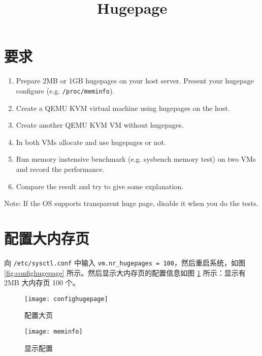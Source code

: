 

    \title{Hugepage}
    \maketitle
    \tableofcontents
    \section{要求}
    \begin{enumerate}[(1)]
        \item Prepare 2MB or 1GB hugepages on your host server. Present your hugepage configure (e.g. \verb"/proc/meminfo").

        \item Create a QEMU KVM virtual machine using hugepages on the host.
     
        \item Create another QEMU KVM VM without hugepages.
        
        \item In both VMs allocate and use hugepages or not.
     
        \item Run memory instensive benchmark (e.g. sysbench memory test) on two VMs and record the performance.
     
        \item Compare the result and try to give some explanation.
    \end{enumerate}

    Note: If the OS supports transparent huge page, disable it when you do the tests.

    \section{配置大内存页}

    向 \verb"/etc/sysctl.conf" 中输入 \texttt{vm.nr\_hugepages = 100}，然后重启系统，如图 \ref{fig:confighugepage} 所示。然后显示大内存页的配置信息如图 \ref{fig:meminfo} 所示：显示有 2MB 大内存页 100 个。

    \begin{figure}[H]
        \centering
        \begin{minipage}{0.48\textwidth}
            \centering
            \texttt{[image: confighugepage]}
            \caption{配置大页}\label{fig:confighugepage}
        \end{minipage}
        \begin{minipage}{0.48\textwidth}
            \centering
            \texttt{[image: meminfo]}
            \caption{显示配置}\label{fig:meminfo}
        \end{minipage}
    \end{figure}

